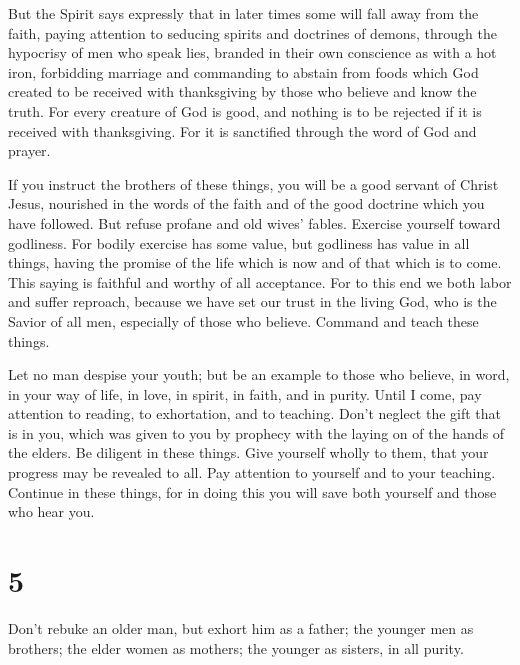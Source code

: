  But the Spirit says expressly that in later times some will
fall away from the faith, paying attention to seducing spirits and
doctrines of demons,  through the hypocrisy of men who speak
lies, branded in their own conscience as with a hot iron, 
forbidding marriage and commanding to abstain from foods which God
created to be received with thanksgiving by those who believe and know
the truth.  For every creature of God is good, and nothing
is to be rejected if it is received with thanksgiving.  For
it is sanctified through the word of God and prayer.

 If you instruct the brothers of these things, you will be a
good servant of Christ Jesus, nourished in the words of the faith and of
the good doctrine which you have followed.  But refuse
profane and old wives' fables. Exercise yourself toward godliness.
 For bodily exercise has some value, but godliness has value
in all things, having the promise of the life which is now and of that
which is to come.  This saying is faithful and worthy of all
acceptance.  For to this end we both labor and suffer
reproach, because we have set our trust in the living God, who is the
Savior of all men, especially of those who believe. 
Command and teach these things.

 Let no man despise your youth; but be an example to those
who believe, in word, in your way of life, in love, in spirit, in faith,
and in purity.  Until I come, pay attention to reading, to
exhortation, and to teaching.  Don't neglect the gift that
is in you, which was given to you by prophecy with the laying on of the
hands of the elders.  Be diligent in these things. Give
yourself wholly to them, that your progress may be revealed to all.
 Pay attention to yourself and to your teaching. Continue
in these things, for in doing this you will save both yourself and those
who hear you.

\hypertarget{section-4}{%
\section{5}\label{section-4}}

 Don't rebuke an older man, but exhort him as a father; the
younger men as brothers;  the elder women as mothers; the
younger as sisters, in all purity.

